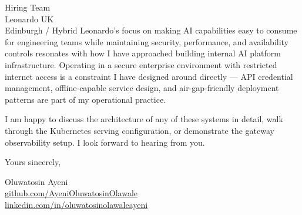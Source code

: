 \documentclass[12pt,a4paper]{letter}
\begin{document}
\begin{letter}{Hiring Team \\ Leonardo UK \\ Edinburgh / Hybrid}
Leonardo's focus on making AI capabilities easy to consume for engineering teams while maintaining security, performance, and availability controls resonates with how I have approached building internal AI platform infrastructure. Operating in a secure enterprise environment with restricted internet access is a constraint I have designed around directly — API credential management, offline-capable service design, and air-gap-friendly deployment patterns are part of my operational practice.

I am happy to discuss the architecture of any of these systems in detail, walk through the Kubernetes serving configuration, or demonstrate the gateway observability setup. I look forward to hearing from you.

\closing{Yours sincerely,}

Oluwatosin Ayeni \\
\href{https://github.com/AyeniOluwatosinOlawale}{github.com/AyeniOluwatosinOlawale} \\
\href{https://www.linkedin.com/in/oluwatosinolawaleayeni/}{linkedin.com/in/oluwatosinolawaleayeni}

\end{letter}
\end{document}
